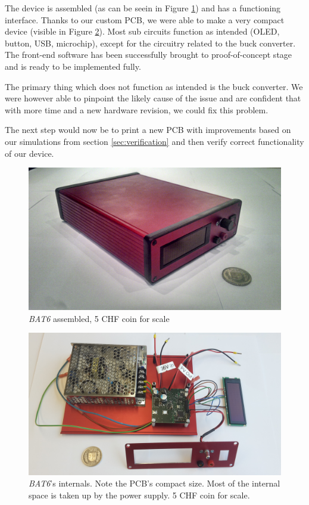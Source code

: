 The device is  assembled (as can be seein  in Figure \ref{fig:bat6:assembled})
and has  a functioning interface. Thanks  to our custom  PCB, we were  able to
make a very compact device (visible in Figure \ref{fig:bat6:internals}).  Most
sub circuits function  as intended (OLED, button, USB,  microchip), except for
the circuitry related to the buck  converter.  The front-end software has been
successfully brought to proof-of-concept stage  and is ready to be implemented
fully.

The  primary  thing   which  does  not  function  as  intended   is  the  buck
converter. We were however able to pinpoint  the likely cause of the issue and
are confident that  with more time and  a new hardware revision,  we could fix
this problem.

The next step would  now be to print a new PCB with  improvements based on our
simulations  from  section  \ref{sec:verification}  and  then  verify  correct
functionality of our device.

\begin{figure}[h!]
    \center
    \includegraphics[width=.8\textwidth]{images/assembled.jpg}
    \caption{\emph{BAT6} assembled, 5 CHF coin for scale}
    \label{fig:bat6:assembled}
\end{figure}

\begin{figure}[h!]
    \center
    \includegraphics[width=.8\textwidth]{images/internals.jpg}
    \caption{\emph{BAT6}'s internals. Note the PCB's compact size. Most of the internal space is taken up by the power supply. 5 CHF coin for scale.}
    \label{fig:bat6:internals}
\end{figure}
